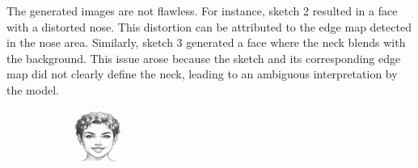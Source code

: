 \documentclass{IEEEcsmag}
\begin{document}
The generated images are not flawless. For instance, sketch 2 resulted in a face with a distorted nose. This distortion can be attributed to the edge map detected in the nose area. Similarly, sketch 3 generated a face where the neck blends with the background. This issue arose because the sketch and its corresponding edge map did not clearly define the neck, leading to an ambiguous interpretation by the model.

\begin{figure}[ht]
    \centering
    \setcounter{subfigure}{0}  %
    
    \begin{subfigure}{0.12\textwidth}
        \includegraphics[width=\linewidth]{Prompted/draws_resized/image4.png}
    \end{subfigure}
    \begin{subfigure}{0.12\textwidth}

\end{subfigure}
\end{figure}
\end{document}
